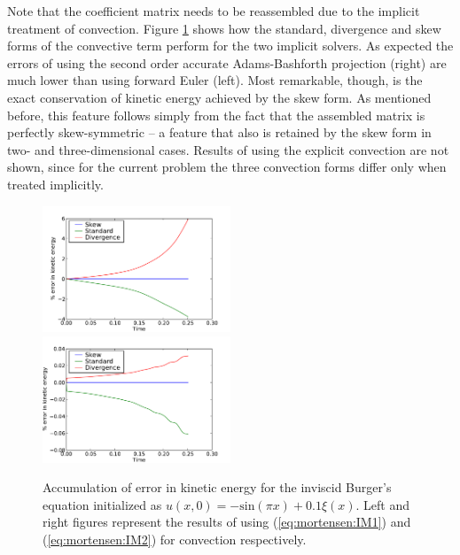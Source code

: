 Note that the coefficient matrix  needs to be reassembled due to the
implicit treatment of convection. Figure \ref{fig:mortensen:burgers_KE} shows
how the standard, divergence and skew forms of the convective term
perform for the two implicit solvers. As expected the errors of using
the second order accurate Adams-Bashforth projection (right) are much
lower than using forward Euler (left). Most remarkable, though, is the
exact conservation of kinetic energy achieved by the skew form. As
mentioned before, this feature follows simply from the fact that
the assembled matrix  is perfectly skew-symmetric -- a feature
that also is retained by the skew form in two- and three-dimensional
cases. Results of using the explicit convection are not shown, since
for the current problem the three convection forms differ only when
treated implicitly.

\begin{figure}
 \includegraphics[width=0.5\textwidth]{chapters/mortensen/pdf/Burgers_KE_IM1.pdf}
 \includegraphics[width=0.5\textwidth]{chapters/mortensen/pdf/Burgers_KE_IM2.pdf}
 \caption{
Accumulation of error in kinetic energy for the inviscid Burger's equation initialized as $u(x,0)=-\text{sin}(\pi x)+0.1 \xi(x)$. Left and right figures represent the results of using (\eqref{eq:mortensen:IM1}) and (\eqref{eq:mortensen:IM2}) for convection respectively.
}
\label{fig:mortensen:burgers_KE}
\end{figure}

